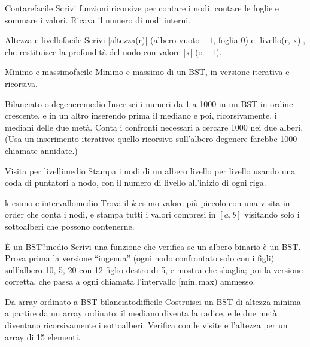 \begin{esercizio}{Contare}{facile}
Scrivi funzioni ricorsive per contare i nodi, contare le foglie e sommare i valori.
Ricava il numero di nodi interni.
\end{esercizio}

\begin{esercizio}{Altezza e livello}{facile}
Scrivi \cc|altezza(r)| (albero vuoto $-1$, foglia 0) e \cc|livello(r, x)|, che restituisce
la profondità del nodo con valore \cc|x| (o $-1$).
\end{esercizio}

\begin{esercizio}{Minimo e massimo}{facile}
Minimo e massimo di un BST, in versione iterativa e ricorsiva.
\end{esercizio}

\begin{esercizio}{Bilanciato o degenere}{medio}
Inserisci i numeri da 1 a 1000 in un BST in ordine crescente, e in un altro inserendo
prima il mediano e poi, ricorsivamente, i mediani delle due metà. Conta i confronti
necessari a cercare 1000 nei due alberi. (Usa un inserimento iterativo: quello ricorsivo
sull'albero degenere farebbe 1000 chiamate annidate.)
\end{esercizio}

\begin{esercizio}{Visita per livelli}{medio}
Stampa i nodi di un albero livello per livello usando una coda di puntatori a nodo, con il
numero di livello all'inizio di ogni riga.
\end{esercizio}

\begin{esercizio}{k-esimo e intervallo}{medio}
Trova il $k$-esimo valore più piccolo con una visita in-order che conta i nodi, e stampa
tutti i valori compresi in $[a, b]$ visitando solo i sottoalberi che possono contenerne.
\end{esercizio}

\begin{esercizio}{È un BST?}{medio}
Scrivi una funzione che verifica se un albero binario è un BST. Prova prima la versione
``ingenua'' (ogni nodo confrontato solo con i figli) sull'albero 10, 5, 20 con 12 figlio
destro di 5, e mostra che sbaglia; poi la versione corretta, che passa a ogni chiamata
l'intervallo $[\text{min}, \text{max})$ ammesso.
\end{esercizio}

\begin{esercizio}{Da array ordinato a BST bilanciato}{difficile}
Costruisci un BST di altezza minima a partire da un array ordinato: il mediano diventa la
radice, e le due metà diventano ricorsivamente i sottoalberi. Verifica con le visite e
l'altezza per un array di 15 elementi.
\end{esercizio}

